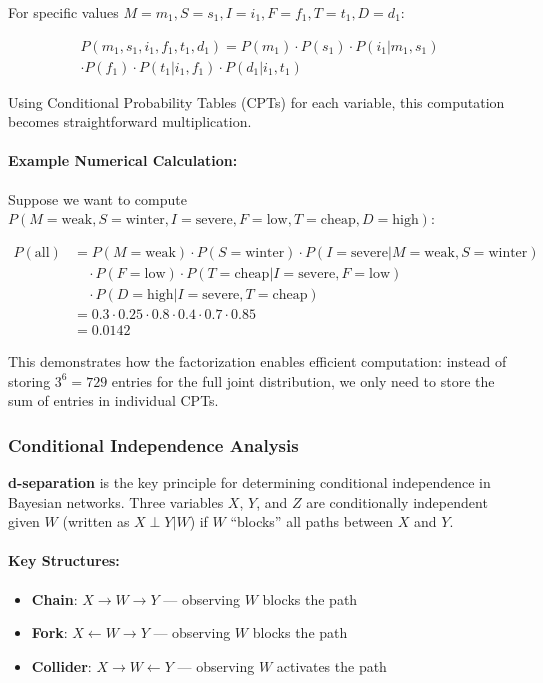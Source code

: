 \documentclass[conference]{IEEEtran}
\begin{document}
For specific values $M = m_1, S = s_1, I = i_1, F = f_1, T = t_1, D = d_1$:

\begin{multline}
P(m_1, s_1, i_1, f_1, t_1, d_1) = P(m_1) \cdot P(s_1) \cdot P(i_1 | m_1, s_1) \\ 
\cdot P(f_1) \cdot P(t_1 | i_1, f_1) \cdot P(d_1 | i_1, t_1)
\end{multline}

Using Conditional Probability Tables (CPTs) for each variable, this computation becomes straightforward multiplication.

\paragraph{Example Numerical Calculation:}
Suppose we want to compute $P(M=\text{weak}, S=\text{winter}, I=\text{severe}, F=\text{low}, T=\text{cheap}, D=\text{high})$:

\begin{align*}
P(\text{all}) &= P(M=\text{weak}) \cdot P(S=\text{winter}) \cdot P(I=\text{severe} | M=\text{weak}, S=\text{winter}) \\
&\quad \cdot P(F=\text{low}) \cdot P(T=\text{cheap} | I=\text{severe}, F=\text{low}) \\
&\quad \cdot P(D=\text{high} | I=\text{severe}, T=\text{cheap}) \\
&= 0.3 \cdot 0.25 \cdot 0.8 \cdot 0.4 \cdot 0.7 \cdot 0.85 \\
&= 0.0142
\end{align*}

This demonstrates how the factorization enables efficient computation: instead of storing $3^6 = 729$ entries for the full joint distribution, we only need to store the sum of entries in individual CPTs.

\subsubsection{Conditional Independence Analysis}

\textbf{d-separation} is the key principle for determining conditional independence in Bayesian networks. Three variables $X$, $Y$, and $Z$ are conditionally independent given $W$ (written as $X \perp Y | W$) if $W$ ``blocks'' all paths between $X$ and $Y$.

\paragraph{Key Structures:}
\begin{itemize}
    \item \textbf{Chain}: $X \rightarrow W \rightarrow Y$ --- observing $W$ blocks the path
    \item \textbf{Fork}: $X \leftarrow W \rightarrow Y$ --- observing $W$ blocks the path
    \item \textbf{Collider}: $X \rightarrow W \leftarrow Y$ --- observing $W$ activates the path
\end{itemize}
\end{document}
